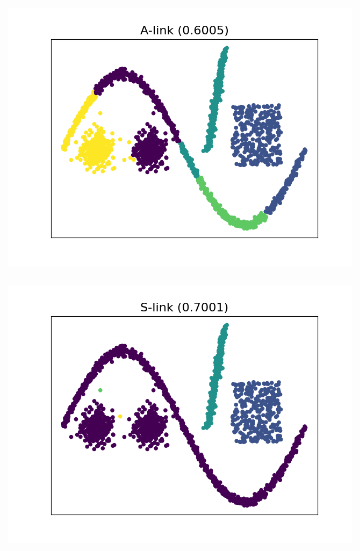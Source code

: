 \begin{figure}[htb]
    \begin{subfigure}[b]{0.32\textwidth}
        \centering
        \includegraphics[width=\textwidth]{../results/plots/dataset_1/A-link_clustering.png}
    \end{subfigure}
    \hfill
    \begin{subfigure}[b]{0.32\textwidth}
        \centering
        \includegraphics[width=\textwidth]{../results/plots/dataset_1/S-link_clustering.png}
    \end{subfigure}
    \hfill
    \begin{subfigure}[b]{0.32\textwidth}
        \centering

\end{subfigure}
\end{figure}
